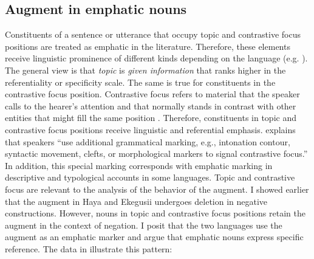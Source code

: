\documentclass[output=paper]{langscibook}
\begin{document}
\subsection{Augment in emphatic nouns}\label{sec:choti:5.3}
Constituents of a sentence or utterance that occupy topic and contrastive focus positions are treated as emphatic in the literature. Therefore, these elements receive linguistic prominence of different kinds depending on the language (e.g. \citealt{gundel2004topic}). The general view is that \textit{topic} is \textit{given information} that ranks higher in the referentiality or specificity scale. The same is true for constituents in the contrastive focus position. Contrastive focus refers to material that the speaker calls to the hearer’s attention and that normally stands in contrast with other entities that might fill the same position \citep[181]{gundel2004topic}. Therefore, constituents in topic and contrastive focus positions receive linguistic and referential emphasis. \citet{zimmermann2008contrastive} explains that speakers “use additional grammatical marking, e.g., intonation contour, syntactic movement, clefts, or morphological markers to signal contrastive focus.” In addition, this special marking corresponds with emphatic marking in descriptive and typological accounts in some languages. Topic and contrastive focus are relevant to the analysis of the behavior of the augment. I showed earlier that the augment in Haya and Ekegusii undergoes deletion in negative constructions. However, nouns in topic and contrastive focus positions retain the augment in the context of negation. I posit that the two languages use the augment as an emphatic marker and argue that emphatic nouns express specific reference. The data in  illustrate this pattern:\largerpage
\end{document}
